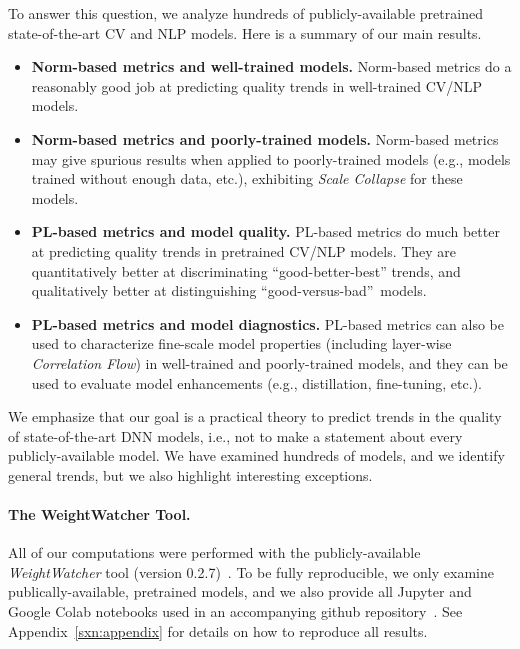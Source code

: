 To answer this question, we analyze hundreds of publicly-available pretrained state-of-the-art CV and NLP models. 
Here is a summary of our main results.
\begin{itemize}
\item
\textbf{Norm-based metrics and well-trained models.}
Norm-based metrics do a reasonably good job at predicting quality trends in well-trained CV/NLP models.
\item
\textbf{Norm-based metrics and poorly-trained models.}
Norm-based metrics may give spurious results when applied to poorly-trained models (e.g., models trained without enough data, etc.), exhibiting \emph{Scale Collapse} for these models. 
\item 
\textbf{PL-based metrics and model quality.}
PL-based metrics do much better at predicting quality trends in pretrained CV/NLP models.  
They are quantitatively better at discriminating ``good-better-best'' trends, and qualitatively better at distinguishing ``good-versus-bad''~models.
\item 
\textbf{PL-based metrics and model diagnostics.}
PL-based metrics can also be used to characterize fine-scale model properties (including layer-wise \emph{Correlation Flow}) in well-trained and poorly-trained models, and they can be used to evaluate model enhancements (e.g., distillation, fine-tuning, etc.).
\end{itemize}

\noindent
We emphasize that our goal is a practical theory to predict trends in the quality of state-of-the-art DNN models, i.e., not to make a statement about every publicly-available model.
We have examined hundreds of models, and we identify general trends, but we also highlight interesting exceptions.


\paragraph{The WeightWatcher Tool.}

All of our computations were performed with the publicly-available \emph{WeightWatcher} tool (version 0.2.7)~\cite{weightwatcher_package}.
To be fully reproducible, we only examine publically-available, pretrained models, and we also provide all Jupyter and Google Colab notebooks used in an accompanying github repository~\cite{kdd20_sub_repo_anonymized}.
See Appendix~\ref{sxn:appendix} for details on how to reproduce all results.


